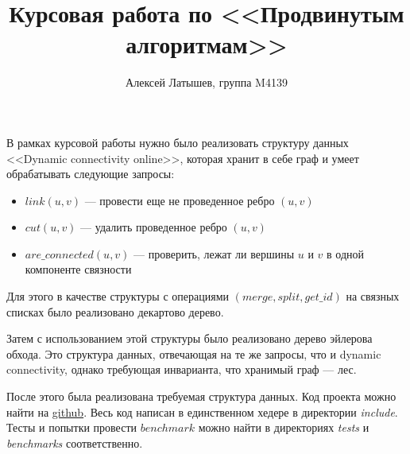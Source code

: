 \documentclass[a4paper]{article}
\title{Курсовая работа по <<Продвинутым алгоритмам>>}
\author{Алексей Латышев, группа M4139}
\begin{document}
\maketitle

В рамках курсовой работы нужно было реализовать структуру данных <<Dynamic
connectivity online>>, которая хранит в себе граф и умеет обрабатывать следующие запросы:
\begin{itemize}
\item $link(u, v)$ --- провести еще не проведенное ребро $(u, v)$
\item $cut(u, v)$ --- удалить проведенное ребро $(u, v)$
\item $are\_connected(u, v)$ --- проверить, лежат ли вершины $u$ и $v$ в одной
  компоненте связности    
\end{itemize}

Для этого в качестве структуры с операциями $(merge, split, get\_id)$ на
связных списках было реализовано декартово дерево.

Затем с использованием этой структуры было реализовано дерево эйлерова обхода.
Это структура данных, отвечающая на те же запросы, что и dynamic connectivity,
однако требующая инварианта, что хранимый граф --- лес.

После этого была реализована требуемая структура данных. Код проекта можно найти
на \href{https://github.com/alex-700/dynamic-connectivity}{github}. Весь код
написан в единственном хедере в директории \emph{include}. Тесты и попытки
провести $benchmark$ можно найти в директориях \emph{tests} и \emph{benchmarks}
соответственно.
\end{document}
